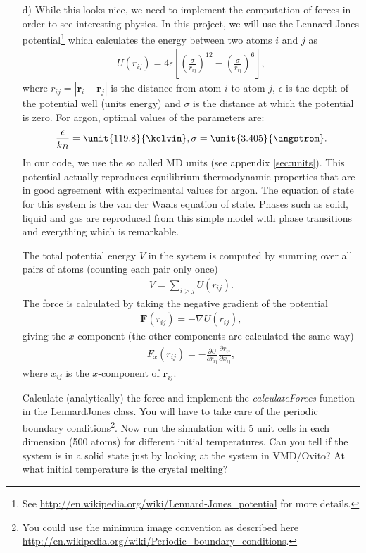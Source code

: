 \documentclass[11pt,a4wide]{article}
\renewcommand{\vec}{\mathbf}
\begin{document}
\begin{enumerate}
\item[d)]
While this looks nice, we need to implement the computation of forces in order to see interesting physics. In this project, we will use the Lennard-Jones potential\footnote{See \url{http://en.wikipedia.org/wiki/Lennard-Jones_potential} for more details.} which calculates the energy between two atoms $i$ and $j$ as
\begin{align}
	U(r_{ij}) = 4\epsilon\left[\left(\frac{\sigma}{r_{ij}}\right)^{12} - \left(\frac{\sigma}{r_{ij}}\right)^6\right],
\end{align}
where $r_{ij} = |\vec r_i - \vec r_j|$ is the distance from atom $i$ to atom $j$, $\epsilon$ is the depth of the potential well (units energy) and $\sigma$ is the distance at which the potential is zero. For argon, optimal values of the parameters are:
\begin{align}
	\frac{\epsilon}{k_B} = \unit{119.8}{\kelvin}, \sigma=\unit{3.405}{\angstrom}.
\end{align}
In our code, we use the so called MD units (see appendix \ref{sec:units}). This potential actually reproduces equilibrium thermodynamic properties that are in good agreement with experimental values for argon. The equation of state for this system is the van der Waals equation of state. Phases such as solid, liquid and gas are reproduced from this simple model with phase transitions and everything which is remarkable.

The total potential energy $V$ in the system is computed by summing over all pairs of atoms (counting each pair only once)
\begin{align}
	V = \sum_{i>j} U(r_{ij}).
\end{align}
The force is calculated by taking the negative gradient of the potential
\begin{align}
	\vec F(r_{ij}) = -\nabla U(r_{ij}),
\end{align}
giving the $x$-component (the other components are calculated the same way)
\begin{align}
	F_x(r_{ij}) = -\frac{\partial U}{\partial r_{ij}}\frac{\partial r_{ij}}{\partial x_{ij}},
\end{align}
where $x_{ij}$ is the $x$-component of $\vec r_{ij}$.

Calculate (analytically) the force and implement the \textit{calculateForces} function in the LennardJones class. You will have to take care of the periodic boundary conditions\footnote{You could use the minimum image convention as described here \url{http://en.wikipedia.org/wiki/Periodic_boundary_conditions}.}. Now run the simulation with 5 unit cells in each dimension (500 atoms) for different initial temperatures. Can you tell if the system is in a solid state just by looking at the system in VMD/Ovito? At what initial temperature is the crystal melting?


\end{enumerate}
\end{document}
